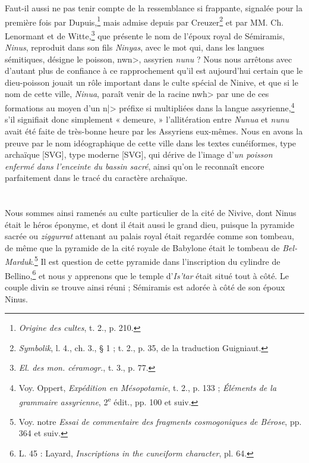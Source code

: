\documentclass[a4paper, 11pt, oneside]{article}
\begin{document}
Faut-il aussi ne pas tenir compte de la ressemblance si frappante, signalée pour la première fois par Dupuis,\footnote{\emph{Origine des cultes}, t. 2., p. 210.} mais admise depuis par Creuzer\footnote{\emph{Symbolik}, l. 4., ch. 3., § 1 ; t. 2., p. 35, de la traduction Guigniaut.} et par MM. Ch. Lenormant et de Witte,\footnote{\emph{El. des mon. céramogr.}, t. 3., p. 77.} que présente le nom de l'époux royal de Sémiramis, \emph{Ninus}, reproduit dans son fils \emph{Ninyas}, avec le mot qui, dans les langues sémitiques, désigne le poisson, \<nwn>, assyrien \emph{nunu} ? Nous nous arrêtons avec d'autant plus de confiance à ce rapprochement qu'il est aujourd'hui certain que le dieu-poisson jouait un rôle important dans le culte spécial de Ninive, et que si le nom de cette ville, \emph{Ninua}, paraît venir de la racine \<nwh> par une de ces formations au moyen d'un \<n|> préfixe si multipliées dans la langue assyrienne,\footnote{Voy. Oppert, \emph{Expédition en Mésopotamie}, t. 2., p. 133 ; \emph{Éléments de la grammaire assyrienne}, 2\textsuperscript{e} édit., pp. 100 et suiv.} s'il signifiait donc simplement « demeure, » l'allitération entre \emph{Nunua} et \emph{nunu} avait été faite de très-bonne heure par les Assyriens eux-mêmes. Nous en avons la preuve par le nom idéographique de cette ville dans les textes cunéiformes, type archaïque [SVG], type moderne [SVG], qui dérive de l'image d'\emph{un poisson enfermé dans l'enceinte du bassin sacré}, ainsi qu'on le reconnaît encore parfaitement dans le tracé du caractère archaïque.

\bigskip \centerline{\EightStarTaper} \centerline{\EightStarTaper\EightStarTaper} \bigskip\clearpage
\section{}
\paragraph{}
Nous sommes ainsi ramenés au culte particulier de la cité de Nivive, dont Ninus était le héros éponyme, et dont il était aussi le grand dieu, puisque la pyramide sacrée ou \emph{ziggurrat} attenant au palais royal était regardée comme son tombeau, de même que la pyramide de la cité royale de Babylone était le tombeau de \emph{Bel-Marduk}.\footnote{Voy. notre \emph{Essai de commentaire des fragments cosmogoniques de Bérose}, pp. 364 et suiv.} Il est question de cette pyramide dans l'inscription du cylindre de Bellino,\footnote{L. 45 : Layard, \emph{Inscriptions in the cuneiform character}, pl. 64.} et nous y apprenons que le temple d'\emph{Is'tar} était situé tout à côté. Le couple divin se trouve ainsi réuni ; Sémiramis est adorée à côté de son époux Ninus.
\end{document}
